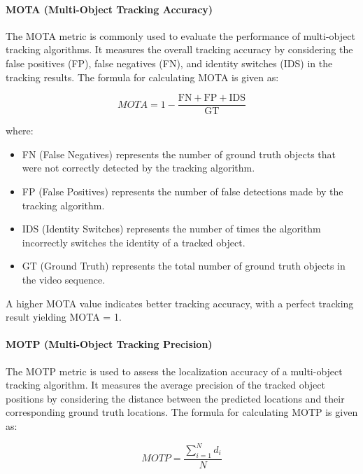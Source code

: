 \paragraph{MOTA (Multi-Object Tracking Accuracy)}
\label{par:4_MOTA}

The MOTA metric is commonly used to evaluate the performance of multi-object tracking algorithms. It measures the overall tracking accuracy by considering the false positives (FP), false negatives (FN), and identity switches (IDS) in the tracking results. The formula for calculating MOTA is given as:

\begin{equation}
	MOTA = 1 - \frac{{\text{{FN}} + \text{{FP}} + \text{{IDS}}}}{{\text{{GT}}}}
\end{equation}

where:

\begin{itemize}
	\item FN (False Negatives) represents the number of ground truth objects that were not correctly detected by the tracking algorithm.
	\item FP (False Positives) represents the number of false detections made by the tracking algorithm.
	\item IDS (Identity Switches) represents the number of times the algorithm incorrectly switches the identity of a tracked object.
	\item GT (Ground Truth) represents the total number of ground truth objects in the video sequence.
\end{itemize}

A higher MOTA value indicates better tracking accuracy, with a perfect tracking result yielding MOTA = 1.

\paragraph{MOTP (Multi-Object Tracking Precision)}
\label{par:4_MOTP}

The MOTP metric is used to assess the localization accuracy of a multi-object tracking algorithm. It measures the average precision of the tracked object positions by considering the distance between the predicted locations and their corresponding ground truth locations. The formula for calculating MOTP is given as:

\begin{equation}
	MOTP = \frac{{\sum_{{i=1}}^{{N}} d_i}}{{N}}
\end{equation}

